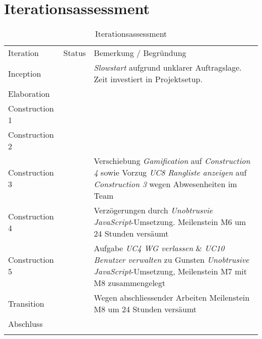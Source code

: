 \chapter{Iterationsassessment}

\begin{table}[H]
	\tablestyle
	\tablealtcolored
	\begin{tabularx}{\textwidth}{l c X}
		\tableheadcolor
		\tablehead Iteration &
		\tablehead Status &
		\tablehead Bemerkung / Begründung \tabularnewline
		\tablebody
			Inception & \faOk & \emph{Slowstart} aufgrund unklarer Auftragslage. Zeit investiert in Projektsetup.\tabularnewline
			Elaboration & \faOk & \tabularnewline
			Construction 1 & \faOk & \tabularnewline
			Construction 2 & \faOk & \tabularnewline
			Construction 3 & \faExclamation & Verschiebung \emph{Gamification} auf \emph{Construction 4} sowie Vorzug \emph{UC8 Rangliste anzeigen} auf \emph{Construction 3} wegen Abwesenheiten im Team\tabularnewline
			Construction 4 & \faExclamation & Verzögerungen durch \emph{Unobtrusvie JavaScript}-Umsetzung. Meilenstein M6 um 24 Stunden versäumt \tabularnewline
			Construction 5 & \faExclamation & Aufgabe \emph{UC4 WG verlassen} \& \emph{UC10 Benutzer verwalten} zu Gunsten \emph{Unobtrusive JavaScript}-Umsetzung, Meilenstein M7 mit M8 zusammengelegt \tabularnewline
			Transition & \faExclamation & Wegen abschliessender Arbeiten Meilenstein M8 um 24 Stunden versäumt \tabularnewline
			Abschluss & \faOk & \tabularnewline
		\tableend
	\end{tabularx}
	\caption{Iterationsassessment}
	\label{tab:iterationAssessment}
\end{table}